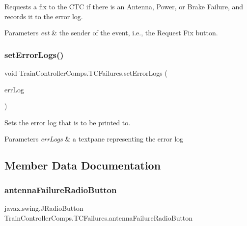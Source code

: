 Requests a fix to the C\+TC if there is an Antenna, Power, or Brake Failure, and records it to the error log. 


\begin{DoxyParams}{Parameters}
{\em evt} & the sender of the event, i.\+e., the \textquotesingle{}Request Fix\textquotesingle{} button. \\
\hline
\end{DoxyParams}
\mbox{\label{classTrainControllerComps_1_1TCFailures_a9ce6a8fde30a39507e3ee5dfb1a02ba3}} 
\subsubsection{\texorpdfstring{set\+Error\+Logs()}{setErrorLogs()}}
{\footnotesize\ttfamily void Train\+Controller\+Comps.\+T\+C\+Failures.\+set\+Error\+Logs (\begin{DoxyParamCaption}\item[{J\+Text\+Pane}]{err\+Log }\end{DoxyParamCaption})}



Sets the error log that is to be printed to. 


\begin{DoxyParams}{Parameters}
{\em err\+Logs} & a textpane representing the error log \\
\hline
\end{DoxyParams}


\subsection{Member Data Documentation}
\mbox{\label{classTrainControllerComps_1_1TCFailures_ac74d2657306216535068bd17548b9661}} 
\subsubsection{\texorpdfstring{antenna\+Failure\+Radio\+Button}{antennaFailureRadioButton}}
{\footnotesize\ttfamily javax.\+swing.\+J\+Radio\+Button Train\+Controller\+Comps.\+T\+C\+Failures.\+antenna\+Failure\+Radio\+Button\hspace{0.3cm}{\ttfamily [private]}}


